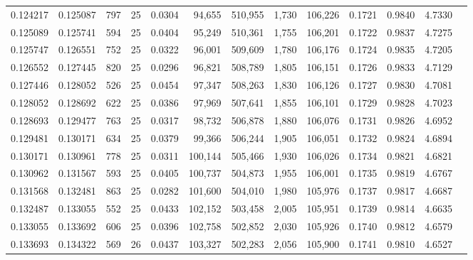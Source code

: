 \begin{tabular}{rrrrrrrrrrrrr}
0.124217 & 0.125087 &   797 &  25 &                                     0.0304 &  94,655 & 510,955 &   1,730 & 106,226 & 0.1721 & 0.9840 & 4.7330 \\
0.125089 & 0.125741 &   594 &  25 &                                     0.0404 &  95,249 & 510,361 &   1,755 & 106,201 & 0.1722 & 0.9837 & 4.7275 \\
0.125747 & 0.126551 &   752 &  25 &                                     0.0322 &  96,001 & 509,609 &   1,780 & 106,176 & 0.1724 & 0.9835 & 4.7205 \\
0.126552 & 0.127445 &   820 &  25 &                                     0.0296 &  96,821 & 508,789 &   1,805 & 106,151 & 0.1726 & 0.9833 & 4.7129 \\
0.127446 & 0.128052 &   526 &  25 &                                     0.0454 &  97,347 & 508,263 &   1,830 & 106,126 & 0.1727 & 0.9830 & 4.7081 \\
0.128052 & 0.128692 &   622 &  25 &                                     0.0386 &  97,969 & 507,641 &   1,855 & 106,101 & 0.1729 & 0.9828 & 4.7023 \\
0.128693 & 0.129477 &   763 &  25 &                                     0.0317 &  98,732 & 506,878 &   1,880 & 106,076 & 0.1731 & 0.9826 & 4.6952 \\
0.129481 & 0.130171 &   634 &  25 &                                     0.0379 &  99,366 & 506,244 &   1,905 & 106,051 & 0.1732 & 0.9824 & 4.6894 \\
0.130171 & 0.130961 &   778 &  25 &                                     0.0311 & 100,144 & 505,466 &   1,930 & 106,026 & 0.1734 & 0.9821 & 4.6821 \\
0.130962 & 0.131567 &   593 &  25 &                                     0.0405 & 100,737 & 504,873 &   1,955 & 106,001 & 0.1735 & 0.9819 & 4.6767 \\
0.131568 & 0.132481 &   863 &  25 &                                     0.0282 & 101,600 & 504,010 &   1,980 & 105,976 & 0.1737 & 0.9817 & 4.6687 \\
0.132487 & 0.133055 &   552 &  25 &                                     0.0433 & 102,152 & 503,458 &   2,005 & 105,951 & 0.1739 & 0.9814 & 4.6635 \\
0.133055 & 0.133692 &   606 &  25 &                                     0.0396 & 102,758 & 502,852 &   2,030 & 105,926 & 0.1740 & 0.9812 & 4.6579 \\
0.133693 & 0.134322 &   569 &  26 &                                     0.0437 & 103,327 & 502,283 &   2,056 & 105,900 & 0.1741 & 0.9810 & 4.6527 \\

\end{tabular}
